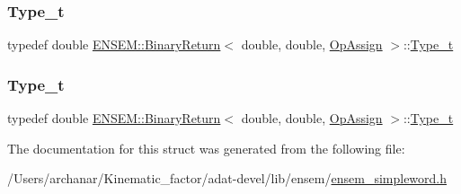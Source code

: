 \mbox{\label{structENSEM_1_1BinaryReturn_3_01double_00_01double_00_01OpAssign_01_4_a69cfbbe6186e9203aee261817f4b3dbd}} 
\subsubsection{\texorpdfstring{Type\_t}{Type\_t}\hspace{0.1cm}{\footnotesize\ttfamily [2/3]}}
{\footnotesize\ttfamily typedef double \mbox{\hyperlink{structENSEM_1_1BinaryReturn}{E\+N\+S\+E\+M\+::\+Binary\+Return}}$<$ double, double, \mbox{\hyperlink{structENSEM_1_1OpAssign}{Op\+Assign}} $>$\+::\mbox{\hyperlink{structENSEM_1_1BinaryReturn_3_01double_00_01double_00_01OpAssign_01_4_a69cfbbe6186e9203aee261817f4b3dbd}{Type\+\_\+t}}}

\mbox{\label{structENSEM_1_1BinaryReturn_3_01double_00_01double_00_01OpAssign_01_4_a69cfbbe6186e9203aee261817f4b3dbd}} 
\subsubsection{\texorpdfstring{Type\_t}{Type\_t}\hspace{0.1cm}{\footnotesize\ttfamily [3/3]}}
{\footnotesize\ttfamily typedef double \mbox{\hyperlink{structENSEM_1_1BinaryReturn}{E\+N\+S\+E\+M\+::\+Binary\+Return}}$<$ double, double, \mbox{\hyperlink{structENSEM_1_1OpAssign}{Op\+Assign}} $>$\+::\mbox{\hyperlink{structENSEM_1_1BinaryReturn_3_01double_00_01double_00_01OpAssign_01_4_a69cfbbe6186e9203aee261817f4b3dbd}{Type\+\_\+t}}}



The documentation for this struct was generated from the following file\+:\begin{DoxyCompactItemize}
\item 
/\+Users/archanar/\+Kinematic\+\_\+factor/adat-\/devel/lib/ensem/\mbox{\hyperlink{adat-devel_2lib_2ensem_2ensem__simpleword_8h}{ensem\+\_\+simpleword.\+h}}\end{DoxyCompactItemize}
